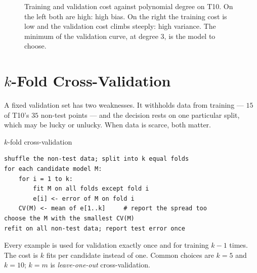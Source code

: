 \begin{figure}[htbp]
  \centering
  \caption{Training and validation cost against polynomial degree on T10. On
  the left both are high: high bias. On the right the training cost is low and
  the validation cost climbs steeply: high variance. The minimum of the
  validation curve, at degree $3$, is the model to choose.}
  \label{fig:degree-curve}
\end{figure}

\section{\texorpdfstring{$k$}{k}-Fold Cross-Validation}
\label{sec:kfold}

A fixed validation set has two weaknesses. It withholds data from training ---
$15$ of T10's $35$ non-test points --- and the decision rests on one particular
split, which may be lucky or unlucky. When data is scarce, both matter.

\begin{algorithmbox}{$k$-fold cross-validation}
\begin{lstlisting}[style=pseudocode]
shuffle the non-test data; split into k equal folds
for each candidate model M:
    for i = 1 to k:
        fit M on all folds except fold i
        e[i] <- error of M on fold i
    CV(M) <- mean of e[1..k]     # report the spread too
choose the M with the smallest CV(M)
refit on all non-test data; report test error once
\end{lstlisting}
Every example is used for validation exactly once and for training $k-1$ times.
The cost is $k$ fits per candidate instead of one. Common choices are $k = 5$
and $k = 10$; $k = m$ is \emph{leave-one-out} cross-validation.
\end{algorithmbox}

